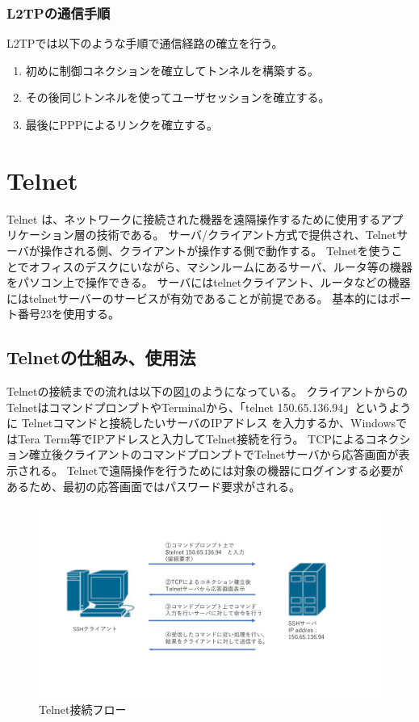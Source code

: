 \documentclass[11pt,a4j,titlepage]{jreport}
\begin{document}
\subsubsection*{L2TPの通信手順}
L2TPでは以下のような手順で通信経路の確立を行う。
\begin{enumerate}
    \setlength{\parskip}{0.05cm} %
    \setlength{\itemsep}{0.05cm}
    \item 初めに制御コネクションを確立してトンネルを構築する。
    \item その後同じトンネルを使ってユーザセッションを確立する。
    \item 最後にPPPによるリンクを確立する。
\end{enumerate}


\section{Telnet}
Telnet \cite{RFC97}は、ネットワークに接続された機器を遠隔操作するために使用するアプリケーション層の技術である。
サーバ/クライアント方式で提供され、Telnetサーバが操作される側、クライアントが操作する側で動作する。
Telnetを使うことでオフィスのデスクにいながら、マシンルームにあるサーバ、ルータ等の機器をパソコン上で操作できる。
サーバにはtelnetクライアント、ルータなどの機器にはtelnetサーバーのサービスが有効であることが前提である。
基本的にはポート番号23を使用する。


\subsection{Telnetの仕組み、使用法}
Telnetの接続までの流れは以下の図\ref{telnet_flow}のようになっている。
クライアントからのTelnetはコマンドプロンプトやTerminalから、「telnet 150.65.136.94」というように
Telnetコマンドと接続したいサーバのIPアドレス
を入力するか、WindowsではTera Term等でIPアドレスと入力してTelnet接続を行う。
TCPによるコネクション確立後クライアントのコマンドプロンプトでTelnetサーバから応答画面が表示される。
Telnetで遠隔操作を行うためには対象の機器にログインする必要があるため、最初の応答画面ではパスワード要求がされる。

\begin{figure}[tbp]
    \centering
    \includegraphics*[width=1.0\textwidth,page=1]{graphs/network_archtecture.pdf}
    \caption{Telnet接続フロー}
    \label{telnet_flow}
\end{figure}
\end{document}
